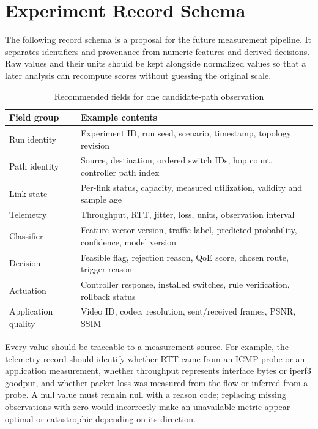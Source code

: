 \documentclass[conference]{IEEEtran}
\begin{document}
\appendices
\section{Experiment Record Schema}
The following record schema is a proposal for the future measurement pipeline. It separates identifiers and provenance from numeric features and derived decisions. Raw values and their units should be kept alongside normalized values so that a later analysis can recompute scores without guessing the original scale.

\begin{table}[t]
\centering
\caption{Recommended fields for one candidate-path observation}
\label{tab:record_schema}
\begin{tabular}{@{}p{}p{}@{}}
\toprule
Field group & Example contents \\
\midrule
Run identity & Experiment ID, run seed, scenario, timestamp, topology revision \\
Path identity & Source, destination, ordered switch IDs, hop count, controller path index \\
Link state & Per-link status, capacity, measured utilization, validity and sample age \\
Telemetry & Throughput, RTT, jitter, loss, units, observation interval \\
Classifier & Feature-vector version, traffic label, predicted probability, confidence, model version \\
Decision & Feasible flag, rejection reason, QoE score, chosen route, trigger reason \\
Actuation & Controller response, installed switches, rule verification, rollback status \\
Application quality & Video ID, codec, resolution, sent/received frames, PSNR, SSIM \\
\bottomrule
\end{tabular}
\end{table}

Every value should be traceable to a measurement source. For example, the telemetry record should identify whether RTT came from an ICMP probe or an application measurement, whether throughput represents interface bytes or iperf3 goodput, and whether packet loss was measured from the flow or inferred from a probe. A null value must remain null with a reason code; replacing missing observations with zero would incorrectly make an unavailable metric appear optimal or catastrophic depending on its direction.
\end{document}

